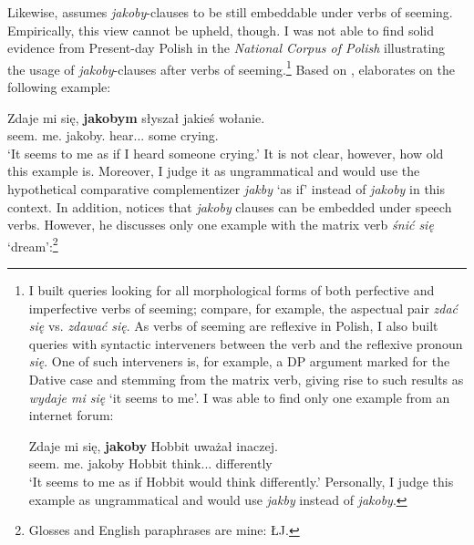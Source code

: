 \documentclass[output=paper]{langsci/langscibook}
\begin{document}
Likewise, \textcite{Wiemer2005} assumes \emph{jakoby}-clauses to be still embeddable under verbs of seeming. Empirically, this view cannot be upheld, though. I was not able to find solid evidence from Present-day Polish in the \emph{National Corpus of Polish} illustrating the usage of \emph{jakoby}-clauses after verbs of seeming.\footnote{I built queries looking for all morphological forms of both perfective and imperfective verbs of seeming; compare, for example, the aspectual pair \emph{zdać się} vs. \emph{zdawać się}. As verbs of seeming are reflexive in Polish, I also built queries with syntactic interveners between the verb and the reflexive pronoun \emph{się}. One of such interveners is, for example, a DP argument marked for the Dative case and stemming from the matrix verb, giving rise to such results as \emph{wydaje mi się} `it seems to me'. I was able to find only one example from an internet forum:

\ea \gll Zdaje mi się, \textbf{jakoby} Hobbit uważał inaczej. \\
		seem.{\thirdperson}{\sg} me.{\dat} {} jakoby Hobbit think.{\lptcp}.{\sg}.{\masc} differently \\
\glt	`It seems to me as if Hobbit would think differently.' 
\z
Personally, I judge this example as ungrammatical and would use \emph{jakby} instead of \emph{jakoby}.}
Based on \textcite{ojasiewicz1992}, \textcite{Wiemer2005} elaborates on the following example:

\ea \gll Zdaje mi się, \textbf{jakobym} słyszał jakieś wołanie.\\
		seem.{\thirdperson}{\sg} me.{\dat} {} jakoby.{\firstperson}{\sg} hear.{\lptcp}.{\sg}.{\masc} some crying.{\acc}\\
\glt	`It seems to me as if I heard someone crying.' 
\z
It is not clear, however, how old this example is. Moreover, I judge it as ungrammatical and would use the hypothetical comparative complementizer \emph{jakby} `as if' instead of \emph{jakoby} in this context. In addition, \textcite[122--124]{Wiemer2005} notices that \emph{jakoby} clauses can be embedded under speech verbs. However, he discusses only one example with the matrix verb \emph{śnić się} `dream':\footnote{Glosses and English paraphrases are mine: ŁJ.
}
\end{document}
